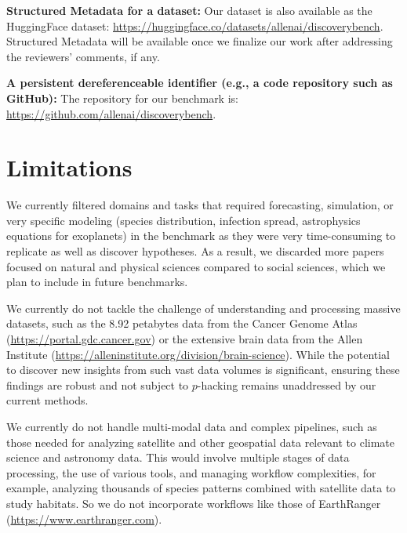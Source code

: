 \begin{enumerate}
    \textbf{Structured Metadata for a dataset:} Our dataset is also available as the HuggingFace dataset: \url{https://huggingface.co/datasets/allenai/discoverybench}. Structured Metadata will be available once we finalize our work after addressing the reviewers' comments, if any.

    \textbf{A persistent dereferenceable identifier (e.g., a code repository such as GitHub):} The repository for our benchmark is: \url{https://github.com/allenai/discoverybench}.

\end{enumerate}

\section{Limitations}
\label{sec:limitations}
We currently filtered domains and tasks that required forecasting, simulation, or very specific modeling (species distribution, infection spread, astrophysics equations for exoplanets) in the benchmark as they were very time-consuming to replicate as well as discover hypotheses. As a result, we discarded more papers focused on natural and physical sciences compared to social sciences, which we plan to include in future benchmarks. 

We currently do not tackle the challenge of understanding and processing massive datasets, such as the 8.92 petabytes data from the Cancer Genome Atlas (\url{https://portal.gdc.cancer.gov}) or the extensive brain data from the Allen Institute (\url{https://alleninstitute.org/division/brain-science}). While the potential to discover new insights from such vast data volumes is significant, ensuring these findings are robust and not subject to $p$-hacking remains unaddressed by our current methods.

We currently do not handle multi-modal data and complex pipelines, such as those needed for analyzing satellite and other geospatial data relevant to climate science and astronomy data. This would involve multiple stages of data processing, the use of various tools, and managing workflow complexities, for example, analyzing thousands of species patterns combined with satellite data to study habitats. So we do not incorporate workflows like those of EarthRanger (\url{https://www.earthranger.com}).


